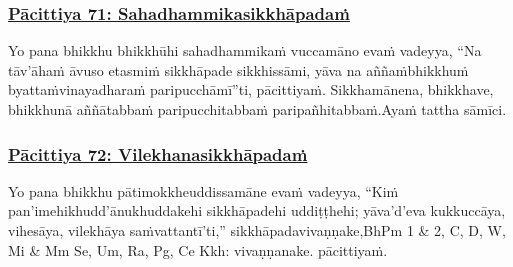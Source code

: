 \subsubsection*{\hyperref[exp71]{Pācittiya 71: Sahadhammikasikkhāpadaṁ}}
\label{pac71}

Yo pana bhikkhu bhikkhūhi sahadhammikaṁ vuccamāno evaṁ vadeyya, ``Na tāv'āhaṁ āvuso etasmiṁ sikkhāpade sikkhissāmi, yāva na aññaṁ\makeatletter\hyperlink{endnote380-appendix}\makeatother \thinspace bhikkhuṁ byattaṁ\makeatletter\hyperlink{endnote381-appendix}\makeatother \thinspace vinayadharaṁ paripucchāmī''ti, pācittiyaṁ. Sikkhamānena, bhikkhave, bhikkhunā aññātabbaṁ paripucchitabbaṁ paripañhitabbaṁ.\makeatletter\hyperlink{endnote382-appendix}\makeatother \thinspace Ayaṁ tattha sāmīci.



\subsubsection*{\hyperref[exp72]{Pācittiya 72: Vilekhanasikkhāpadaṁ}}
\label{pac72}

Yo pana bhikkhu pātimokkhe\makeatletter\hyperlink{endnote383-appendix}\makeatother \thinspace uddissamāne evaṁ vadeyya, ``Kiṁ pan'imehi\makeatletter\hyperlink{endnote384-appendix}\makeatother \thinspace khudd'ānukhuddakehi sikkhāpadehi uddiṭṭhehi; yāva'd'eva kukkuccāya, vihesāya, vilekhāya saṁvattantī'ti,'' sikkhāpadavivaṇṇake,\makeatletter\hyperlink{endnote385-appendix}\makeatother \thinspace BhPm 1 \& 2, C, D, W, Mi \& Mm Se, Um, Ra, Pg, Ce Kkh: vivaṇṇanake. pācittiyaṁ.



